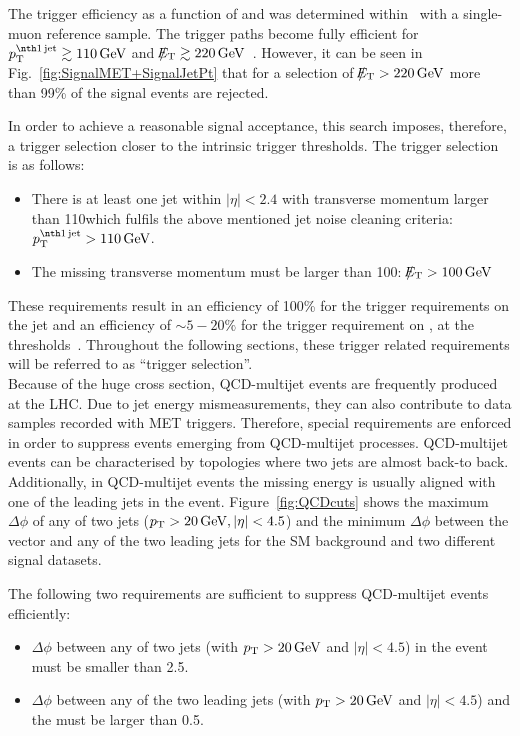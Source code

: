 The trigger efficiency as a function of \met and \ptfirstjet was determined within~\cite{bib:CMS:DM_8TeV} with a single-muon reference sample.
The trigger paths become fully efficient for $\ptfirstjet \gtrsim 110\gev$ and $\slash\mkern-12mu{E}_{\text{T}} \gtrsim 220\,\text{Ge}\kern-0.06667em\text{V}$~\cite{bib:CMS:DM_8TeV_AN}.
However, it can be seen in Fig.~\ref{fig:SignalMET+SignalJetPt} that for a selection of \mbox{$\slash\mkern-12mu{E}_{\text{T}}>220\,\text{Ge}\kern-0.06667em\text{V}$} more than 99\% of the signal events are rejected.

In order to achieve a reasonable signal acceptance, this search imposes, therefore, a trigger selection closer to the intrinsic trigger thresholds.
The trigger selection is as follows:
\begin{itemize}
\renewcommand{\labelitemi}{\footnotesize{\ding{118}}}
\item There is at least one jet within $|\eta|<2.4$ with transverse momentum larger than 110\gev which fulfils the above mentioned jet noise cleaning criteria: \mbox{$\ptfirstjet>110\gev$}.
\item The missing transverse momentum must be larger than 100\gev: \mbox{$\slash\mkern-12mu{E}_{\text{T}}>100\,\text{Ge}\kern-0.06667em\text{V}$}
\end{itemize}
These requirements result in an efficiency of 100\% for the trigger requirements on the jet \pt and an efficiency of $\sim5-20\%$ for the trigger requirement on \met, at the \met thresholds~\cite{bib:CMS:DM_8TeV_AN}.
Throughout the following sections, these trigger related requirements will be referred to as ``trigger selection''.\\  %

Because of the huge cross section, QCD-multijet events are frequently produced at the LHC.
Due to jet energy mismeasurements, they can also contribute to data samples recorded with MET triggers.
Therefore, special requirements are enforced in order to suppress events emerging from QCD-multijet processes.
QCD-multijet events can be characterised by topologies where two jets are almost back-to back.
Additionally, in QCD-multijet events the missing energy is usually aligned with one of the leading jets in the event.
Figure~\ref{fig:QCDcuts} shows the maximum $\Delta\phi$ of any of two jets ($p_{\text{T}}>20\,\text{Ge}\kern-0.06667em\text{V}, |\eta|<4.5$) and the minimum $\Delta\phi$ between the \met vector and any of the two leading jets for the SM background and two different signal datasets.

The following two requirements are sufficient to suppress QCD-multijet events efficiently:
\begin{itemize}
\renewcommand{\labelitemi}{\footnotesize{\ding{118}}}
\item $\Delta\phi$ between any of two jets (with $p_{\text{T}}>20\,\text{Ge}\kern-0.06667em\text{V}$ and $|\eta|<4.5$) in the event must be smaller than 2.5. %
\item $\Delta\phi$ between any of the two leading jets (with $p_{\text{T}}>20\,\text{Ge}\kern-0.06667em\text{V}$ and $|\eta|<4.5$) and the \met must be larger than 0.5. %
\end{itemize}

